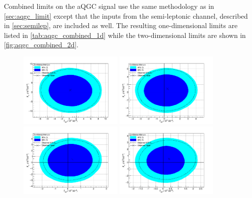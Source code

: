 Combined limits on the aQGC signal use the same methodology
as in \sec\ref{sec:aqgc_limit} except that the inputs from the semi-leptonic
channel, described in \sec\ref{sec:semilep}, are included as well.
The resulting one-dimensional limits are listed in \tab\ref{tab:aqgc_combined_1d}
while the two-dimensional limits are shown in \fig\ref{fig:aqgc_combined_2d}.


\begin{figure}[h!]
\begin{center}

\includegraphics[width=0.45\textwidth]{figures/combination/Comb500-Lim.png}
\includegraphics[width=0.45\textwidth]{figures/combination/Comb100-Lim.png}\\
\includegraphics[width=0.45\textwidth]{figures/combination/Comb200-Lim.png}
\includegraphics[width=0.45\textwidth]{figures/combination/Comb300-Lim.png}\\

\end{center}
\end{figure}
